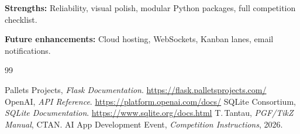 \documentclass[11pt,a4paper,twoside=false]{report}
\begin{document}
\vspace{0.4cm}
\textbf{Strengths:} Reliability, visual polish, modular Python packages, full competition checklist.

\textbf{Future enhancements:} Cloud hosting, WebSockets, Kanban lanes, email notifications.

\vspace{1cm}
\begin{center}
\end{center}

\begin{thebibliography}{99}
 Pallets Projects, \textit{Flask Documentation}. \url{https://flask.palletsprojects.com/}
 OpenAI, \textit{API Reference}. \url{https://platform.openai.com/docs/}
 SQLite Consortium, \textit{SQLite Documentation}. \url{https://www.sqlite.org/docs.html}
 T.\,Tantau, \textit{PGF/TikZ Manual}, CTAN.
 AI App Development Event, \textit{Competition Instructions}, 2026.
\end{thebibliography}
\end{document}
